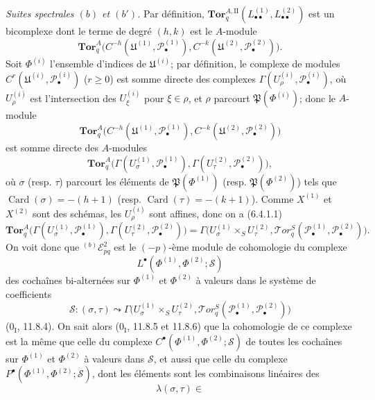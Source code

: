 \begin{env}[6.6.4]
\emph{Suites spectrales $(b)$ et $(b')$.} Par définition,
$\mathbf{Tor}_q^{A,\mathrm{II}}
(L_{\bullet\bullet}^{(1)},L_{\bullet\bullet}^{(2)})$ est un bicomplexe dont
le terme de degré $(h,k)$ est le $A$-module
\[
  \mathbf{Tor}_q^A
  \bigl(C^{-h}(\mathfrak U^{(1)},\mathscr P_\bullet^{(1)}),
        C^{-k}(\mathfrak U^{(2)},\mathscr P_\bullet^{(2)})\bigr).
\]
Soit $\Phi^{(i)}$ l'ensemble d'indices de $\mathfrak U^{(i)}$; par
définition, le complexe de modules
$C^r(\mathfrak U^{(i)},\mathscr P_\bullet^{(i)})$ ($r\geqslant0$) est somme
directe des complexes
$\Gamma(U_\rho^{(i)},\mathscr P_\bullet^{(i)})$, où $U_\rho^{(i)}$ est
l'intersection des $U_\xi^{(i)}$ pour $\xi\in\rho$, et $\rho$ parcourt
$\mathfrak P(\Phi^{(i)})$; donc le $A$-module
\[
  \mathbf{Tor}_q^A
  \bigl(C^{-h}(\mathfrak U^{(1)},\mathscr P_\bullet^{(1)}),
        C^{-k}(\mathfrak U^{(2)},\mathscr P_\bullet^{(2)})\bigr)
\]
est somme directe des $A$-modules
\[
  \mathbf{Tor}_q^A
  \bigl(\Gamma(U_\sigma^{(1)},\mathscr P_\bullet^{(1)}),
        \Gamma(U_\tau^{(2)},\mathscr P_\bullet^{(2)})\bigr),
\]
où $\sigma$ (resp. $\tau$) parcourt les éléments de
$\mathfrak P(\Phi^{(1)})$ (resp. $\mathfrak P(\Phi^{(2)})$) tels que
$\operatorname{Card}(\sigma)=-(h+1)$ (resp.
$\operatorname{Card}(\tau)=-(k+1)$). Comme $X^{(1)}$ et $X^{(2)}$ sont des
schémas, les $U_\rho^{(i)}$ sont affines, donc on a (6.4.1.1)
\[
  \mathbf{Tor}_q^A
  \bigl(\Gamma(U_\sigma^{(1)},\mathscr P_\bullet^{(1)}),
        \Gamma(U_\tau^{(2)},\mathscr P_\bullet^{(2)})\bigr)
  =\Gamma\bigl(U_\sigma^{(1)}\times_S U_\tau^{(2)},
    \mathscr{T}\!or_q^S
    (\mathscr P_\bullet^{(1)},\mathscr P_\bullet^{(2)})\bigr).
\]
On voit donc que ${}^{(b)}\mathscr E_{pq}^2$ est le $(-p)$-ème module de
cohomologie du complexe
\[
  L^\bullet(\Phi^{(1)},\Phi^{(2)};\mathscr S)
\]
des cochaînes bi-alternées sur $\Phi^{(1)}$ et $\Phi^{(2)}$ à valeurs dans le
système de coefficients
\[
  \mathscr S:(\sigma,\tau)\leadsto
  \Gamma\bigl(U_\sigma^{(1)}\times_S U_\tau^{(2)},
    \mathscr{T}\!or_q^S
    (\mathscr P_\bullet^{(1)},\mathscr P_\bullet^{(2)})\bigr)
\]
($0_{\mathrm I}$, 11.8.4). On sait alors ($0_{\mathrm I}$, 11.8.5 et 11.8.6)
que la cohomologie de ce complexe est la même que celle du complexe
$C^\bullet(\Phi^{(1)},\Phi^{(2)};\mathscr S)$ de toutes les cochaînes sur
$\Phi^{(1)}$ et $\Phi^{(2)}$ à valeurs dans $\mathscr S$, et aussi que celle du
complexe $P^\bullet(\Phi^{(1)},\Phi^{(2)};\mathscr S)$, dont les éléments sont
les combinaisons linéaires des
\[
  \lambda(\sigma,\tau)\in
\]
\end{env}
